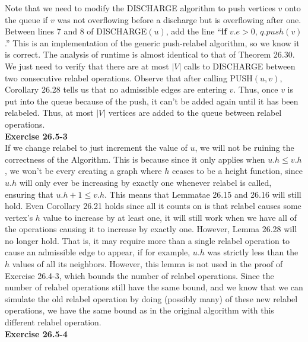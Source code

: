 \documentclass{article}
\begin{document}
Note that we need to modify the DISCHARGE algorithm to push vertices $v$ onto the queue if $v$ was not overflowing before a discharge but is overflowing after one.  Between lines 7 and 8 of DISCHARGE$(u)$, add the line ``\textbf{if} $v.e > 0$, $q.push(v)$.''  This is an implementation of the generic push-relabel algorithm, so we know it is correct.  The analysis of runtime is almost identical to that of Theorem 26.30. We just need to verify that there are at most $|V|$ calls to DISCHARGE between two consecutive relabel operations.  Observe that after calling PUSH$(u,v)$, Corollary 26.28 tells us that no admissible edges are entering $v$.  Thus, once $v$ is put into the queue because of the push, it can't be added again until it has been relabeled.   Thus, at most $|V|$ vertices are added to the queue between relabel operations.\\

\noindent\textbf{Exercise 26.5-3}\\

If we change relabel to just increment the value of $u$, we will not be ruining the correctness of the Algorithm. This is because since it only applies when $u.h\le v.h$, we won't be every creating a graph where $h$ ceases to be a height function, since $u.h$ will only ever be increasing by exactly one whenever relabel is called, ensuring that $u.h +1 \le v.h$. This means that Lemmatae 26.15 and 26.16 will still hold. Even Corollary 26.21 holds since all it counts on is that relabel causes some vertex's $h$ value to increase by at least one, it will still work when we have all of the operations causing it to increase by exactly one. However, Lemma 26.28 will no longer hold. That is, it may require more than a single relabel operation to cause an admissible edge to appear, if for example, $u.h$ was strictly less than the $h$ values of all its neighbors. However, this lemma is not used in the proof of Exercise 26.4-3, which bounds the number of relabel operations. Since the number of relabel operations still have the same bound, and we know that we can simulate the old relabel operation by doing (possibly many) of these new relabel operations, we have the same bound as in the original algorithm with this different relabel operation.\\

\noindent\textbf{Exercise 26.5-4}\\
\end{document}
